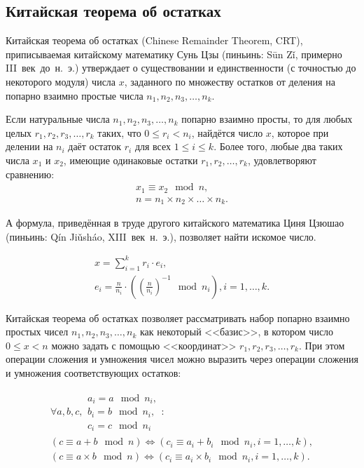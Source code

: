 \subsection{Китайская теорема об остатках}

Китайская теорема об остатках (Chinese Remainder Theorem, CRT), приписываемая китайскому математику Сунь Цзы (пиньинь: S\={u}n Z\v{i}, примерно III~век~до~н.~э.) утверждает о существовании и единственности (с точностью до некоторого модуля) числа $x$, заданного по множеству остатков от деления на попарно взаимно простые числа $n_1, n_2, n_3, \dots, n_k$.

\begin{theorem} Если натуральные числа $n_1, n_2, n_3, \dots, n_k$ попарно взаимно просты, то для любых целых $r_1, r_2, r_3, \dots, r_k$ таких, что $0 \leq r_i < n_i$, найдётся число $x$, которое при делении на $n_i$ даёт остаток $r_i$ для всех $1 \leq i \leq k$. Более того, любые два таких числа $x_1$ и $x_2$, имеющие одинаковые остатки $r_1, r_2, \dots, r_k$, удовлетворяют сравнению:
\[ \begin{array}{l}
	x_1 \equiv x_2 \mod n, \\
	n = n_1 \times n_2 \times \dots \times n_k.
\end{array} \]
\end{theorem}

А формула, приведённая в труде другого китайского математика Циня Цзюшао (пиньинь: Q\'{i}n Ji\v{u}sh\'{a}o, XIII~век~н.~э.), позволяет найти искомое число.

\[ \begin{array}{l}
	x = \sum\limits_{i=1}^k r_i \cdot e_i, \\
	e_i = \frac{n}{n_i} \cdot \left( \left(\frac{n}{n_i}\right)^{-1} \mod n_i \right), i = 1, \dots, k.
\end{array} \]

Китайская теорема об остатках позволяет рассматривать набор попарно взаимно простых чисел $n_1, n_2, n_3, \dots, n_k$ как некоторый <<базис>>, в котором число $0 \leq x < n$ можно задать с помощью <<координат>> $r_1, r_2, r_3, \dots, r_k$. При этом операции сложения и умножения чисел можно выразить через операции сложения и умножения соответствующих остатков:

\[ \begin{array}{l}
	\forall a, b, c, \begin{array}{l}
		a_i = a \mod n_i, \\
		b_i = b \mod n_i, \\
		c_i = c \mod n_i
	\end{array}: \\
	\left( c \equiv a + b \mod n \right) \Leftrightarrow \left( c_i \equiv a_i + b_i \mod n_i, i = 1, \dots, k \right), \\
	\left( c \equiv a \times b \mod n \right) \Leftrightarrow \left( c_i \equiv a_i \times b_i \mod n_i, i = 1, \dots, k \right).
\end{array} \]

